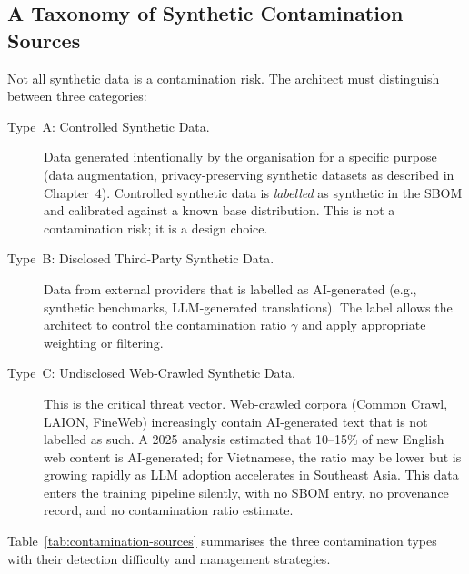 \subsection{A Taxonomy of Synthetic Contamination Sources}
\label{subsec:contamination-taxonomy}

Not all synthetic data is a contamination risk.
The architect must distinguish between three categories:

\begin{description}
  \item[Type~A: Controlled Synthetic Data.]
    Data generated intentionally by the organisation for a
    specific purpose (data augmentation, privacy-preserving
    synthetic datasets as described in Chapter~4).
    Controlled synthetic data is \emph{labelled} as synthetic
    in the SBOM and calibrated against a known base
    distribution.
    This is not a contamination risk; it is a design choice.

  \item[Type~B: Disclosed Third-Party Synthetic Data.]
    Data from external providers that is labelled as
    AI-generated (e.g., synthetic benchmarks, LLM-generated
    translations).
    The label allows the architect to control the
    contamination ratio $\gamma$ and apply appropriate
    weighting or filtering.

  \item[Type~C: Undisclosed Web-Crawled Synthetic Data.]
    This is the critical threat vector.
    Web-crawled corpora (Common Crawl, LAION, FineWeb)
    increasingly contain AI-generated text that is not labelled
    as such.
    A 2025 analysis estimated that 10--15\% of new English web
    content is AI-generated; for Vietnamese, the ratio may be
    lower but is growing rapidly as LLM adoption accelerates
    in Southeast Asia.
    This data enters the training pipeline silently, with no
    SBOM entry, no provenance record, and no contamination
    ratio estimate.
\end{description}

Table~\ref{tab:contamination-sources} summarises the three
contamination types with their detection difficulty and
management strategies.

